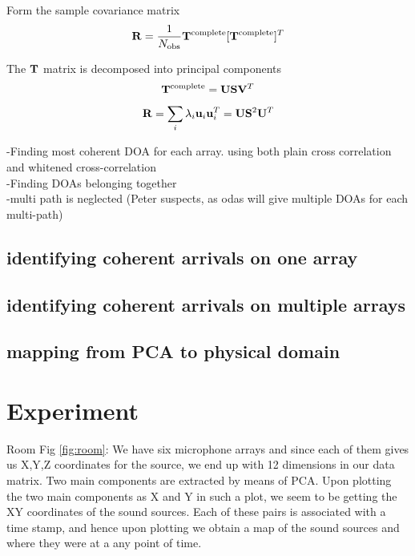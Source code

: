 \documentclass[journal]{IEEEtran}
\begin{document}
Form the sample covariance matrix
\begin{equation}
{\bf R}=\frac{1}{N_{\rm obs}}{\bf T}^{\rm complete} [{\bf T}^{\rm complete}]^T
\end{equation}

The $\bf T$ matrix is decomposed into principal components
\begin{equation} 
{\bf T}^{\rm complete}={\bf U}{\bf S}{\bf V}^T
\end{equation}
\begin{equation}
{\bf R}=\sum_i{\lambda_i}{\bf u}_i{\bf u}_i^T={\bf U}{\bf S}^2{\bf U}^T
\end{equation}

\noindent
-Finding most coherent DOA for each array. using both plain cross correlation and whitened cross-correlation\\
-Finding DOAs belonging together\\
-multi path is neglected (Peter suspects, as odas will give multiple DOAs for each multi-path)

\subsection{identifying coherent arrivals on one array}
\subsection{identifying coherent arrivals on multiple arrays}

\subsection{mapping from PCA to physical domain}


\section{Experiment}

Room Fig \ref{fig:room}:
We have  six microphone arrays and since each of them gives us X,Y,Z coordinates for the source, we end up with 12 dimensions in our data matrix. Two main components are extracted by means of PCA. Upon plotting the two main components as X and Y in such a plot, we seem to be getting the XY coordinates of the sound sources. Each of these pairs is associated with a time stamp, and hence upon plotting we obtain a map of the sound sources and where they were at a any point of time.
\end{document}
